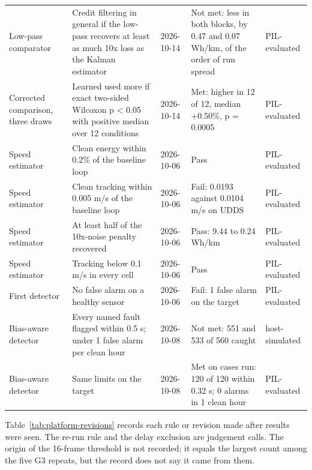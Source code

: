 \documentclass{ieeeaccess}
\begin{document}
\begin{table}[!t]
\begin{tabularx}{\textwidth}{@{}XXXXX@{}}
Low-pass comparator & Credit filtering in general if the low-pass recovers at least as much 10x loss as the Kalman estimator & 2026-10-14 & Not met: less in both blocks, by 0.47 and 0.07 Wh/km, of the order of run spread & PIL-evaluated \\
Corrected comparison, three draws & Learned used more if exact two-sided Wilcoxon p \textless{} 0.05 with positive median over 12 conditions & 2026-10-14 & Met: higher in 12 of 12, median +0.50\%, p = 0.0005 & PIL-evaluated \\
Speed estimator & Clean energy within 0.2\% of the baseline loop & 2026-10-06 & Pass & PIL-evaluated \\
Speed estimator & Clean tracking within 0.005 m/s of the baseline loop & 2026-10-06 & Fail: 0.0193 against 0.0104 m/s on UDDS & PIL-evaluated \\
Speed estimator & At least half of the 10x-noise penalty recovered & 2026-10-06 & Pass: 9.44 to 0.24 Wh/km & PIL-evaluated \\
Speed estimator & Tracking below 0.1 m/s in every cell & 2026-10-06 & Pass & PIL-evaluated \\
First detector & No false alarm on a healthy sensor & 2026-10-06 & Fail: 1 false alarm on the target & PIL-evaluated \\
Bias-aware detector & Every named fault flagged within 0.5 s; under 1 false alarm per clean hour & 2026-10-08 & Not met: 551 and 533 of 560 caught & host-simulated \\
Bias-aware detector & Same limits on the target & 2026-10-08 & Met on cases run: 120 of 120 within 0.32 s; 0 alarms in 1 clean hour & PIL-evaluated \\
\hline
\end{tabularx}
\end{table}

Table~\ref{tab:platform-revisions} records each rule or revision made after results were seen. The re-run rule and the delay exclusion are judgement calls. The origin of the 16-frame threshold is not recorded; it equals the largest count among the five G3 repeats, but the record does not say it came from them.
\end{document}
